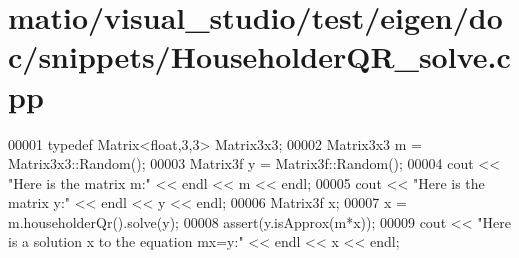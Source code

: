 \hypertarget{matio_2visual__studio_2test_2eigen_2doc_2snippets_2_householder_q_r__solve_8cpp_source}{}\section{matio/visual\+\_\+studio/test/eigen/doc/snippets/\+Householder\+Q\+R\+\_\+solve.cpp}
\label{matio_2visual__studio_2test_2eigen_2doc_2snippets_2_householder_q_r__solve_8cpp_source}

\begin{DoxyCode}
00001 \textcolor{keyword}{typedef} Matrix<float,3,3> Matrix3x3;
00002 Matrix3x3 m = Matrix3x3::Random();
00003 Matrix3f y = Matrix3f::Random();
00004 cout << \textcolor{stringliteral}{"Here is the matrix m:"} << endl << m << endl;
00005 cout << \textcolor{stringliteral}{"Here is the matrix y:"} << endl << y << endl;
00006 Matrix3f x;
00007 x = m.householderQr().solve(y);
00008 assert(y.isApprox(m*x));
00009 cout << \textcolor{stringliteral}{"Here is a solution x to the equation mx=y:"} << endl << x << endl;
\end{DoxyCode}
